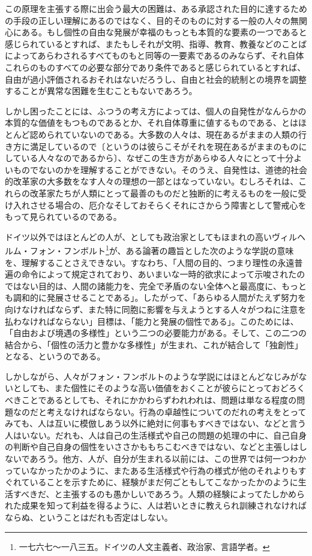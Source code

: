 この原理を主張する際に出会う最大の困難は、ある承認された目的に達するための手段の正しい理解にあるのではなく、目的そのものに対する一般の人々の無関心にある。もし個性の自由な発展が幸福のもっとも本質的な要素の一つであると感じられているとすれば、またもしそれが文明、指導、教育、教養などのことばによってあらわされるすべてものもと同等の一要素であるのみならず、それ自体これらのものすべての必要な部分であり条件であると感じられているとすれば、自由が過小評価されるおそれはないだろうし、自由と社会的統制との境界を調整することが異常な困難を生むこともないであろう。


しかし困ったことには、ふつうの考え方によっては、個人の自発性がなんらかの本質的な価値をもつものであるとか、それ自体尊重に値するものである、とはほとんど認められていないのである。大多数の人々は、現在あるがままの人類の行き方に満足しているので〔というのは彼らこそがそれを現在あるがままのものにしている人々なのであるから〕、なぜこの生き方があらゆる人々にとって十分よいものでないのかを理解することができない。そのうえ、自発性は、道徳的社会的改革家の大多数をなす人々の理想の一部とはなっていない。むしろそれは、これらの改革家たちが人類にとって最善のものだと独断的に考えるものを一般に受け入れさせる場合の、厄介なそしておそらくそれにさからう障害として警戒心をもって見られているのである。


ドイツ以外ではほとんどの人が、としても政治家としてもほまれの高いヴィルヘルム・フォン・フンボルト\footnote{一七六七〜一八三五。ドイツの人文主義者、政治家、言語学者。}が、ある論著の趣旨とした次のような学説の意味を、理解することさえできない。すなわち、「人間の目的、つまり理性の永遠普遍の命令によって規定されており、あいまいな一時的欲求によって示唆されたのではない目的は、人間の諸能力を、完全で矛盾のない全体へと最高度に、もっとも調和的に発展させることである」。したがって、「あらゆる人間がたえず努力を向けなければならず、また特に同胞に影響を与えようとする人々がつねに注意を払わなければならない」目標は、「能力と発展の個性である」。このためには、「自由および境遇の多様性」という二つの必要能力がある。そして、この二つの結合から、「個性の活力と豊かな多様性」が生まれ、これが結合して「独創性」となる、というのである。

しかしながら、人々がフォン・フンボルトのような学説にはほとんどなじみがないとしても、また個性にそのような高い価値をおくことが彼らにとっておどろくべきことであるとしても、それにかかわらずわれわれは、問題は単なる程度の問題なのだと考えなければならない。行為の卓越性についてのだれの考えをとってみても、人は互いに模倣しあう以外に絶対に何事もすべきではない、などと言う人はいない。だれも、人は自己の生活様式や自己の問題の処理の中に、自己自身の判断や自己自身の個性をいささかももちこむべきではない、などと主張しはしないであろう。他方、人が、自分が生まれる以前には、この世界では何一つわかっていなかったかのように、またある生活様式や行為の様式が他のそれよりもすぐれていることを示すために、経験がまだ何ごともしてこなかったかのように生活すべきだ、と主張するのも愚かしいであろう。人類の経験によってたしかめられた成果を知って利益を得るように、人は若いときに教えられ訓練されなければならぬ、ということはだれも否定はしない。


